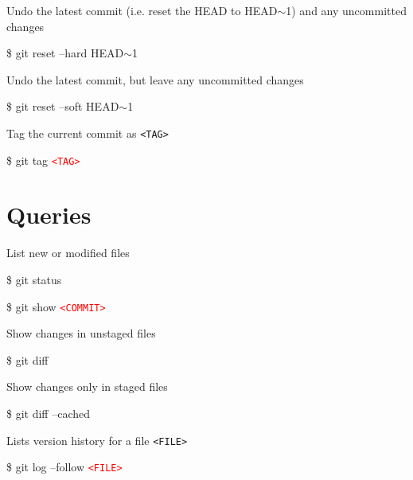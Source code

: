 \documentclass[10pt,a4paper]{article}
\newenvironment{cheatentry}{%
    \noindent%
    \begin{minipage}{\columnwidth}%
    \small%
    \noindent%
}{%
    \end{minipage}%
}
\newenvironment{cheatcmde}{%
    \noindent%
    \begin{cmdbox}%
    \begin{flushleft}%
    \bgroup%
    \setlength{\parindent}{-12pt}%
    \ttfamily\fontseries{b}\selectfont\large%
    \hspace{\parindent}%
}{%
    \egroup%
    \end{flushleft}%
    \end{cmdbox}%
}
\newcommand{\entrysep}{\vspace{1em}}
\newcommand{\cheatcmd}[1]{%
    \begin{cheatcmde}#1\end{cheatcmde}
}
\newcommand{\cheatmetavar}[1]{%
    \textcolor{red}{\texttt{\textless{}#1\textgreater{}}}%
}
\newcommand{\cheatmetavarref}[1]{%
    {\texttt{\textless{}#1\textgreater{}}}%
}
\newcommand{\HEADP}[1][]{HEAD$\sim$#1}
\begin{document}
\begin{multicols}{4}
\entrysep{}%

\begin{cheatentry}%
Undo the latest commit (i.e. reset the HEAD to HEAD$\sim$1) and any uncommitted changes
\cheatcmd{\$ git reset --hard \HEADP[1]}
\end{cheatentry}

\entrysep{}%

\begin{cheatentry}%
Undo the latest commit, but leave any uncommitted changes
\cheatcmd{\$ git reset --soft \HEADP[1]}
\end{cheatentry}

\entrysep{}%

\begin{cheatentry}%
Tag the current commit as \cheatmetavarref{TAG}
\cheatcmd{\$ git tag \cheatmetavar{TAG}}
\end{cheatentry}

\section*{Queries}

\begin{cheatentry}%
List new or modified files
\cheatcmd{\$ git status}
\end{cheatentry}

\entrysep{}%

\begin{cheatentry}%

\cheatcmd{\$ git show \cheatmetavar{COMMIT}}
\end{cheatentry}

\entrysep{}%

\begin{cheatentry}%
Show changes in unstaged files
\cheatcmd{\$ git diff}
\end{cheatentry}

\entrysep{}%

\begin{cheatentry}%
Show changes only in staged files
\cheatcmd{\$ git diff --cached}
\end{cheatentry}

\entrysep{}%

\begin{cheatentry}%
Lists version history for a file \cheatmetavarref{FILE}
\cheatcmd{\$ git log --follow \cheatmetavar{FILE}}
\end{cheatentry}



\end{multicols}
\end{document}
